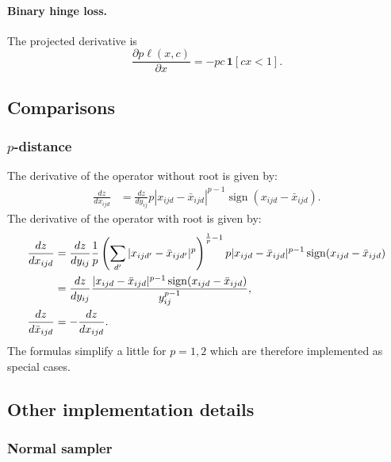 \paragraph{Binary hinge loss.} The projected derivative is
\[
\frac{\partial p \ell(x,c)}{\partial x}
=
- pc\,\mathbf{1}[cx < 1].
\]

\subsection{Comparisons}\label{s:impl-comparisons}

\subsubsection{$p$-distance}\label{s:impl-pdistance}

The derivative of the operator without root is given by:
\begin{align*}
\frac{dz}{dx_{ijd}}
&=
\frac{dz}{dy_{ij}}
p |x_{ijd} - \bar x_{ijd}|^{p-1} \operatorname{sign} (x_{ijd} - \bar x_{ijd}).
\end{align*}
The derivative of the operator with root is given by:
\begin{align*}
\frac{dz}{dx_{ijd}}
&=
\frac{dz}{dy_{ij}}
\frac{1}{p}
\left(\sum_{d'} |x_{ijd'} - \bar x_{ijd'}|^p \right)^{\frac{1}{p}-1}
p |x_{ijd} - \bar x_{ijd}|^{p-1} \sign(x_{ijd} - \bar x_{ijd})
\\
&= 
\frac{dz}{dy_{ij}}
\frac{|x_{ijd} - \bar x_{ijd}|^{p-1} \sign(x_{ijd} - \bar x_{ijd})}{y_{ij}^{p-1}}, \\
\frac{dz}{d\bar x_{ijd}} &= -\frac{dz}{dx_{ijd}}.
\end{align*}
The formulas simplify a little for $p=1,2$ which are therefore implemented as special cases.


\subsection{Other implementation details}\label{s:impl-others}

\subsubsection{Normal sampler}\label{s:impl-normal}

